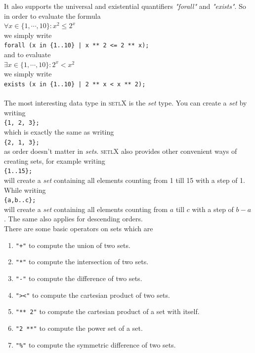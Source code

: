 \documentclass[11pt]{report}
\begin{document}
It also supports the universal and existential quantifiers \textsl{"forall"} and \textsl{"exists"}.
So in order to evaluate the formula
\\[0.2cm]
\hspace*{1.3cm}
$\forall x \in \{ 1, \cdots, 10 \}: x^2 \leq 2^x$
\\[0.2cm]
we simply write
\\[0.2cm]
\hspace*{1.3cm}
\texttt{forall (x in \{1..10\} | x ** 2 <= 2 ** x);}
\\[0.2cm]
and to evaluate
\\[0.2cm]
\hspace*{1.3cm}
$\exists x \in \{ 1, \cdots, 10 \}: 2^x < x^2$
\\[0.2cm]
we simply write
\\[0.2cm]
\hspace*{1.3cm}
\texttt{exists (x in \{1..10\} | 2 ** x < x ** 2);}
\\[0.2cm]
\\
The most interesting data type in \textsc{setlX} is the \textsl{set} type. You can create a \textsl{set} by writing
\\[0.2cm]
\hspace*{1.3cm}
\texttt{\{1, 2, 3\};}
\\[0.2cm]
which is exactly the same as writing
\\[0.2cm]
\hspace*{1.3cm}
\texttt{\{2, 1, 3\};}
\\[0.2cm]
as order doesn't matter in \textsl{sets}. \textsc{setlX} also provides other convenient ways of creating sets, for example writing
\\[0.2cm]
\hspace*{1.3cm}
\texttt{\{1..15\};}
\\[0.2cm]
will create a \textsl{set} containing all elements counting from 1 till 15 with a step of 1. While writing
\\[0.2cm]
\hspace*{1.3cm}
\texttt{\{a,b..c\};}
\\[0.2cm]
will create a \textsl{set} containing all elements counting from $a$ till $c$ with a step of $b-a$. The same also applies for descending orders.
\\
There are some basic operators on sets which are
\begin{enumerate}
\item \texttt{"+"} to compute the union of two sets.
\item \texttt{"*"} to compute the intersection of two sets.
\item \texttt{"-"} to compute the difference of two sets.
\item \texttt{"><"} to compute the cartesian product of two sets.
\item \texttt{"** 2"} to compute the cartesian product of a set with itself.
\item \texttt{"2 **"} to compute the power set of a set.
\item \texttt{"\%"} to compute the symmetric difference of two sets.
\end{enumerate}
\end{document}
